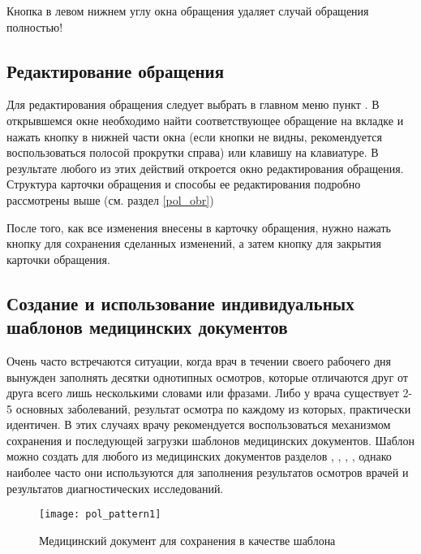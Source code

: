 \begin{vnim}
 Кнопка  в левом нижнем углу окна обращения удаляет случай обращения полностью!
\end{vnim} 

\subsection{Редактирование обращения}

Для редактирования обращения следует выбрать в главном меню пункт . В открывшемся окне необходимо найти соответствующее обращение на вкладке  и нажать кнопку  в нижней части окна (если кнопки не видны, рекомендуется воспользоваться полосой прокрутки справа) или клавишу  на клавиатуре. В результате любого из этих действий откроется окно редактирования обращения. Структура карточки обращения и способы ее редактирования подробно рассмотрены выше (см. раздел \ref{pol_obr})

После того, как все изменения внесены в карточку обращения, нужно нажать кнопку  для сохранения сделанных изменений, а затем кнопку  для закрытия карточки обращения.

\subsection{Создание и использование индивидуальных шаблонов медицинских документов} \label{pol_pattern}

Очень часто встречаются ситуации, когда врач в течении своего рабочего дня вынужден заполнять десятки однотипных осмотров, которые отличаются друг от друга всего лишь несколькими словами или фразами. Либо у врача существует 2-5 основных заболеваний, результат осмотра по каждому из которых, практически идентичен. В этих случаях врачу рекомендуется воспользоваться механизмом сохранения и последующей загрузки шаблонов медицинских документов. Шаблон можно создать для любого из медицинских документов разделов , , , , однако наиболее часто они используются для заполнения результатов осмотров врачей и результатов диагностических исследований.

 \begin{figure}[ht!]\centering
   \texttt{[image: pol\_pattern1]}
   \caption{Медицинский документ для сохранения в качестве шаблона}
   \label{img_pol_pattern1}
 \end{figure}
 
